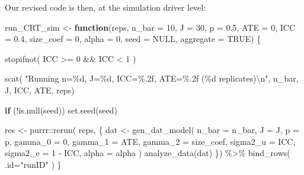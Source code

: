 \documentclass[
]{book}
\newenvironment{Shaded}{\begin{snugshade}}{\end{snugshade}}
\newcommand{\AttributeTok}[1]{\textcolor[rgb]{0.77,0.63,0.00}{#1}}
\newcommand{\ConstantTok}[1]{\textcolor[rgb]{0.00,0.00,0.00}{#1}}
\newcommand{\ControlFlowTok}[1]{\textcolor[rgb]{0.13,0.29,0.53}{\textbf{#1}}}
\newcommand{\DecValTok}[1]{\textcolor[rgb]{0.00,0.00,0.81}{#1}}
\newcommand{\FloatTok}[1]{\textcolor[rgb]{0.00,0.00,0.81}{#1}}
\newcommand{\FunctionTok}[1]{\textcolor[rgb]{0.00,0.00,0.00}{#1}}
\newcommand{\NormalTok}[1]{#1}
\newcommand{\OtherTok}[1]{\textcolor[rgb]{0.56,0.35,0.01}{#1}}
\newcommand{\SpecialCharTok}[1]{\textcolor[rgb]{0.00,0.00,0.00}{#1}}
\newcommand{\StringTok}[1]{\textcolor[rgb]{0.31,0.60,0.02}{#1}}
\begin{document}
Our revised code is then, at the simulation driver level:

\begin{Shaded}
\begin{Highlighting}[]
\NormalTok{run\_CRT\_sim }\OtherTok{\textless{}{-}} \ControlFlowTok{function}\NormalTok{(reps, }
                        \AttributeTok{n\_bar =} \DecValTok{10}\NormalTok{, }\AttributeTok{J =} \DecValTok{30}\NormalTok{, }\AttributeTok{p =} \FloatTok{0.5}\NormalTok{,}
                        \AttributeTok{ATE =} \DecValTok{0}\NormalTok{, }\AttributeTok{ICC =} \FloatTok{0.4}\NormalTok{,}
                        \AttributeTok{size\_coef =} \DecValTok{0}\NormalTok{, }\AttributeTok{alpha =} \DecValTok{0}\NormalTok{,}
                        \AttributeTok{seed =} \ConstantTok{NULL}\NormalTok{, }\AttributeTok{aggregate =} \ConstantTok{TRUE}\NormalTok{) \{}

  \FunctionTok{stopifnot}\NormalTok{( ICC }\SpecialCharTok{\textgreater{}=} \DecValTok{0} \SpecialCharTok{\&\&}\NormalTok{ ICC }\SpecialCharTok{\textless{}} \DecValTok{1}\NormalTok{ )}
  
  \FunctionTok{scat}\NormalTok{( }\StringTok{"Running n=\%d, J=\%d, ICC=\%.2f, ATE=\%.2f (\%d replicates)}\SpecialCharTok{\textbackslash{}n}\StringTok{"}\NormalTok{, n\_bar, J, ICC, ATE, reps)}

  \ControlFlowTok{if}\NormalTok{ (}\SpecialCharTok{!}\FunctionTok{is.null}\NormalTok{(seed)) }\FunctionTok{set.seed}\NormalTok{(seed)}

\NormalTok{  res }\OtherTok{\textless{}{-}} 
\NormalTok{    purrr}\SpecialCharTok{::}\FunctionTok{rerun}\NormalTok{( reps, \{}
\NormalTok{      dat }\OtherTok{\textless{}{-}} \FunctionTok{gen\_dat\_model}\NormalTok{( }\AttributeTok{n\_bar =}\NormalTok{ n\_bar, }\AttributeTok{J =}\NormalTok{ J, }\AttributeTok{p =}\NormalTok{ p,}
                            \AttributeTok{gamma\_0 =} \DecValTok{0}\NormalTok{, }\AttributeTok{gamma\_1 =}\NormalTok{ ATE, }\AttributeTok{gamma\_2 =}\NormalTok{ size\_coef,}
                            \AttributeTok{sigma2\_u =}\NormalTok{ ICC, }\AttributeTok{sigma2\_e =} \DecValTok{1} \SpecialCharTok{{-}}\NormalTok{ ICC,}
                            \AttributeTok{alpha =}\NormalTok{ alpha )}
      \FunctionTok{analyze\_data}\NormalTok{(dat)}
\NormalTok{    \}) }\SpecialCharTok{\%\textgreater{}\%}
    \FunctionTok{bind\_rows}\NormalTok{( }\AttributeTok{.id=}\StringTok{"runID"}\NormalTok{ )}
\NormalTok{\}}
\end{Highlighting}
\end{Shaded}
\end{document}
